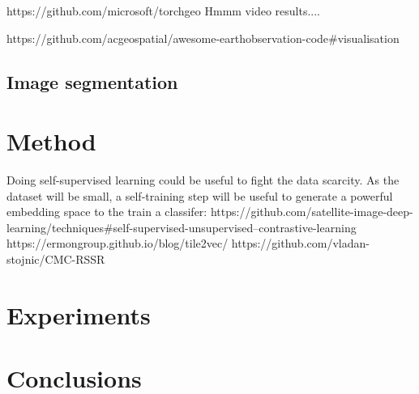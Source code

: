 \documentclass[notitlepage]{report}
\begin{document}
    https://github.com/microsoft/torchgeo
    \newline
    Hmmm video results....

    https://github.com/acgeospatial/awesome-earthobservation-code#visualisation

    \subsection*{Image segmentation}


    \section*{Method}

    Doing self-supervised learning could be useful to fight the data scarcity.
    As the dataset will be small, a self-training step will be useful to generate
    a powerful embedding space to the train a classifer:
    https://github.com/satellite-image-deep-learning/techniques#self-supervised-unsupervised--contrastive-learning
    https://ermongroup.github.io/blog/tile2vec/
    https://github.com/vladan-stojnic/CMC-RSSR


    \section*{Experiments}


    \section*{Conclusions}
\end{document}
